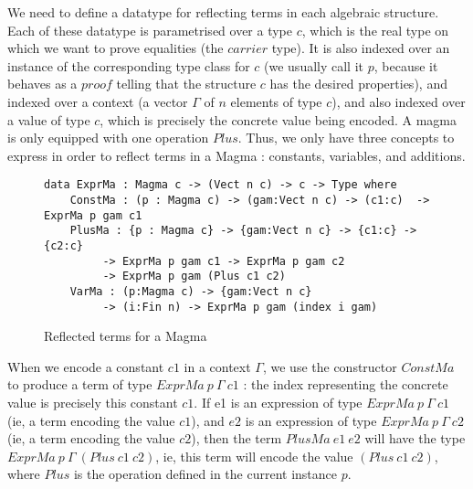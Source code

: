 We need to define a datatype for reflecting terms in each algebraic structure.
Each of these datatype is parametrised over a type $c$, which is the real type on which we want to prove equalities (the $carrier$ type). It is also indexed over an instance of the corresponding type class for $c$ (we usually call it $p$, because it behaves as a $proof$ telling that the structure $c$ has the desired properties), and indexed over a context (a vector $\Gamma$ of $n$ elements of type $c$), and also indexed over a value of type $c$, which is precisely the concrete value being encoded.
A magma is only equipped with one operation $Plus$. Thus, we only have three concepts to express in order to reflect terms in a Magma : constants, variables, and additions.



\begin{figure}[H]
\figrule
\begin{center}
\begin{verbatim}
data ExprMa : Magma c -> (Vect n c) -> c -> Type where
    ConstMa : (p : Magma c) -> (gam:Vect n c) -> (c1:c)  -> ExprMa p gam c1 
    PlusMa : {p : Magma c} -> {gam:Vect n c} -> {c1:c} -> {c2:c} 
         -> ExprMa p gam c1 -> ExprMa p gam c2 
         -> ExprMa p gam (Plus c1 c2) 
    VarMa : (p:Magma c) -> {gam:Vect n c}
         -> (i:Fin n) -> ExprMa p gam (index i gam)
\end{verbatim}
\end{center}
\caption{Reflected terms for a Magma}
\figrule
\end{figure}

When we encode a constant $c1$ in a context $\Gamma$, we use the constructor $ConstMa$ to produce a term of type $ExprMa\ p\ \Gamma\ c1$ : the index representing the concrete value is precisely this constant $c1$.
If e1 is an expression of type $ExprMa\ p\ \Gamma\ c1$ (ie, a term encoding the value $c1$), and $e2$ is an expression of type $ExprMa\ p\ \Gamma\ c2$ (ie, a term encoding the value $c2$), then the term $PlusMa\ e1\ e2$ will have the type $ExprMa\ p\ \Gamma\ (Plus\ c1\ c2)$, ie, this term will encode the value $(Plus\ c1\ c2)$, where $Plus$ is the operation defined in the current instance $p$.


